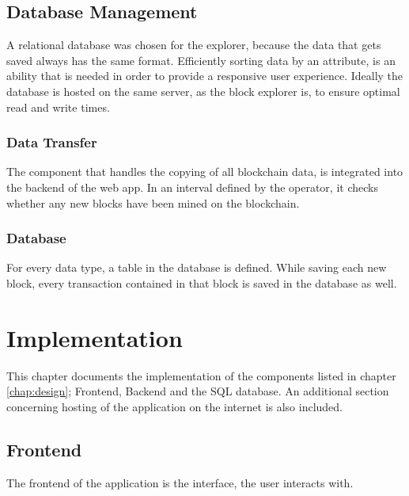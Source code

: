 \section{Database Management}
A relational database was chosen for the explorer, because the data that gets saved always has the same format. Efficiently sorting data by an attribute, is an ability that is needed in order to provide a responsive user experience. Ideally the database is hosted on the same server, as the block explorer is, to ensure optimal read and write times. 
\subsection{Data Transfer}
The component that handles the copying of all blockchain data, is integrated into the backend of the web app. In an interval defined by the operator, it checks whether any new blocks have been mined on the blockchain. 
\subsection{Database}
For every data type, a table in the database is defined. While saving each new block, every transaction contained in that block is saved in the database as well. 

\chapter{Implementation}
This chapter documents the implementation of the components listed in chapter \ref{chap:design}; Frontend, Backend and the SQL database. An additional section concerning hosting of the application on the internet is also included.
\section{Frontend}
The frontend of the application is the interface, the user interacts with. 
